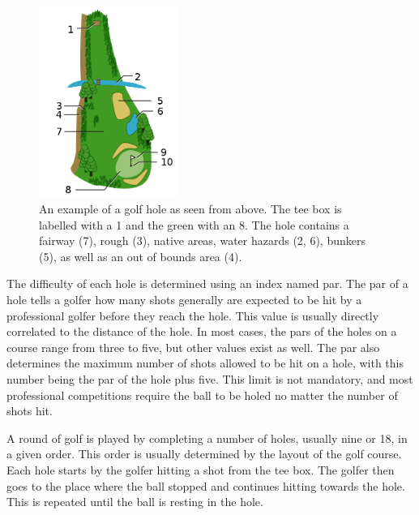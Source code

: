 \documentclass{kththesis}
\begin{document}
\begin{figure}
    \centering
    \includegraphics[width=0.4\textwidth]{golffield.png}
    \caption{An example of a golf hole as seen from above. The tee box is labelled with a 1 and the green with an 8. The hole contains a fairway (7), rough (3), native areas, water hazards (2, 6), bunkers (5), as well as an out of bounds area (4).}
    \label{fig:golfhole}
\end{figure}

The difficulty of each hole is determined using an index named par. The par of a hole tells a golfer how many shots generally are expected to be hit by a professional golfer before they reach the hole. This value is usually directly correlated to the distance of the hole. In most cases, the pars of the holes on a course range from three to five, but other values exist as well. The par also determines the maximum number of shots allowed to be hit on a hole, with this number being the par of the hole plus five. This limit is not mandatory, and most professional competitions require the ball to be holed no matter the number of shots hit.

A round of golf is played by completing a number of holes, usually nine or 18, in a given order. This order is usually determined by the layout of the golf course. Each hole starts by the golfer hitting a shot from the tee box. The golfer then goes to the place where the ball stopped and continues hitting towards the hole. This is repeated until the ball is resting in the hole.
\end{document}
